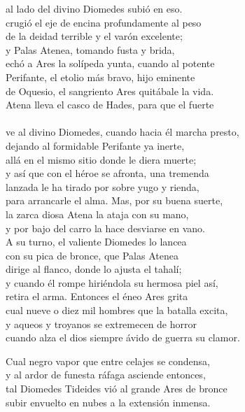 al lado del divino Diomedes subió en eso.\\
crugió el eje de encina profundamente al peso\\
de la deidad terrible y el varón excelente;\\
y Palas Atenea, tomando fusta y brida,\\
echó a Ares la solípeda yunta, cuando al potente\\
Perifante, el etolio más bravo, hijo eminente\\
de Oquesio, el sangriento Ares quitábale la vida.\\
Atena lleva el casco de Hades, para que el fuerte\\
\\
ve al divino Diomedes, cuando hacia él marcha presto,\\
dejando al formidable Perifante ya inerte,\\
allá en el mismo sitio donde le diera muerte;\\
y así que con el héroe se afronta, una tremenda\\
lanzada le ha tirado por sobre yugo y rienda,\\
para arrancarle el alma. Mas, por su buena suerte,\\
la zarca diosa Atena la ataja con su mano,\\
y por bajo del carro la hace desviarse en vano.\\
A su turno, el valiente Diomedes lo lancea\\
con su pica de bronce, que Palas Atenea\\
dirige al flanco, donde lo ajusta el tahalí;\\
y cuando él rompe hiriéndola su hermosa piel así,\\
retira el arma. Entonces el éneo Ares grita\\
cual nueve o diez mil hombres que la batalla excita,\\
y aqueos y troyanos se extremecen de horror\\
cuando alza el dios siempre ávido de guerra su clamor.\par
Cual negro vapor que entre celajes se condensa,\\
y al ardor de funesta ráfaga asciende entonces,\\
tal Diomedes Tideides vió al grande Ares de bronce\\
subir envuelto en nubes a la extensión inmensa.\par
\poend
\enum